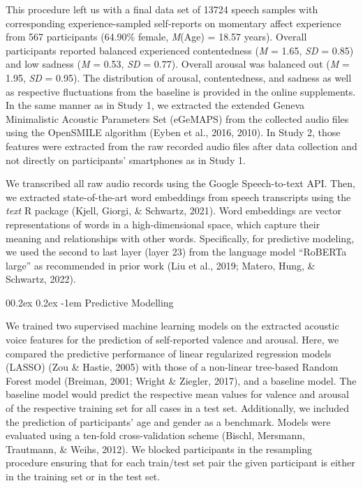 \documentclass[
  man,floatsintext]{apa6}
\makeatletter
\let\oldparagraph\paragraph
\renewcommand{\paragraph}[1]{\oldparagraph{#1}\mbox{}}
\renewcommand{\paragraph}{\@startsection{paragraph}{4}{\parindent}%
  {0\baselineskip \@plus 0.2ex \@minus 0.2ex}%
  {-1em}%
  {\normalfont\normalsize\bfseries\itshape\typesectitle}}
\makeatother
\begin{document}
This procedure left us with a final data set of 13724 speech samples with corresponding experience-sampled self-reports on momentary affect experience from 567 participants (64.90\% female, \emph{M}(Age) = 18.57 years). Overall participants reported balanced experienced contentedness (\emph{M} = 1.65, \emph{SD} = 0.85) and low sadness (\emph{M} = 0.53, \emph{SD} = 0.77). Overall arousal was balanced out (\emph{M} = 1.95, \emph{SD} = 0.95). The distribution of arousal, contentedness, and sadness as well as respective fluctuations from the baseline is provided in the online supplements.
In the same manner as in Study 1, we extracted the extended Geneva Minimalistic Acoustic Parameters Set (eGeMAPS) from the collected audio files using the OpenSMILE algorithm (Eyben et al., 2016, 2010). In Study 2, those features were extracted from the raw recorded audio files after data collection and not directly on participants' smartphones as in Study 1.

We transcribed all raw audio records using the Google Speech-to-text API. Then, we extracted state-of-the-art word embeddings from speech transcripts using the \emph{text} R package (Kjell, Giorgi, \& Schwartz, 2021). Word embeddings are vector representations of words in a high-dimensional space, which capture their meaning and relationships with other words. Specifically, for predictive modeling, we used the second to last layer (layer 23) from the language model ``RoBERTa large'' as recommended in prior work (Liu et al., 2019; Matero, Hung, \& Schwartz, 2022).

\hypertarget{predictive-modelling}{%
\paragraph{Predictive Modelling}\label{predictive-modelling}}

We trained two supervised machine learning models on the extracted acoustic voice features for the prediction of self-reported valence and arousal. Here, we compared the predictive performance of linear regularized regression models (LASSO) (Zou \& Hastie, 2005) with those of a non-linear tree-based Random Forest model (Breiman, 2001; Wright \& Ziegler, 2017), and a baseline model. The baseline model would predict the respective mean values for valence and arousal of the respective training set for all cases in a test set. Additionally, we included the prediction of participants' age and gender as a benchmark. Models were evaluated using a ten-fold cross-validation scheme (Bischl, Mersmann, Trautmann, \& Weihs, 2012). We blocked participants in the resampling procedure ensuring that for each train/test set pair the given participant is either in the training set or in the test set.
\end{document}
